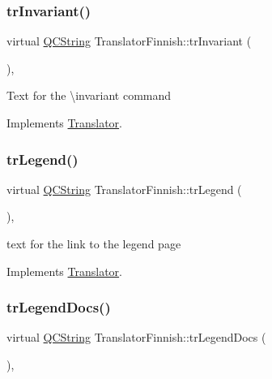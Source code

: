 \subsubsection{\texorpdfstring{trInvariant()}{trInvariant()}}
{\footnotesize\ttfamily virtual \mbox{\hyperlink{class_q_c_string}{Q\+C\+String}} Translator\+Finnish\+::tr\+Invariant (\begin{DoxyParamCaption}{ }\end{DoxyParamCaption})\hspace{0.3cm}{\ttfamily [inline]}, {\ttfamily [virtual]}}

Text for the \textbackslash{}invariant command 

Implements \mbox{\hyperlink{class_translator}{Translator}}.

\mbox{\label{class_translator_finnish_a897ec5c1b3179de70583091bd4a0e1dd}} 
\subsubsection{\texorpdfstring{trLegend()}{trLegend()}}
{\footnotesize\ttfamily virtual \mbox{\hyperlink{class_q_c_string}{Q\+C\+String}} Translator\+Finnish\+::tr\+Legend (\begin{DoxyParamCaption}{ }\end{DoxyParamCaption})\hspace{0.3cm}{\ttfamily [inline]}, {\ttfamily [virtual]}}

text for the link to the legend page 

Implements \mbox{\hyperlink{class_translator}{Translator}}.

\mbox{\label{class_translator_finnish_a654312deba615e3a12265129e2eccf8e}} 
\subsubsection{\texorpdfstring{trLegendDocs()}{trLegendDocs()}}
{\footnotesize\ttfamily virtual \mbox{\hyperlink{class_q_c_string}{Q\+C\+String}} Translator\+Finnish\+::tr\+Legend\+Docs (\begin{DoxyParamCaption}{ }\end{DoxyParamCaption})\hspace{0.3cm}{\ttfamily [inline]}, {\ttfamily [virtual]}}

